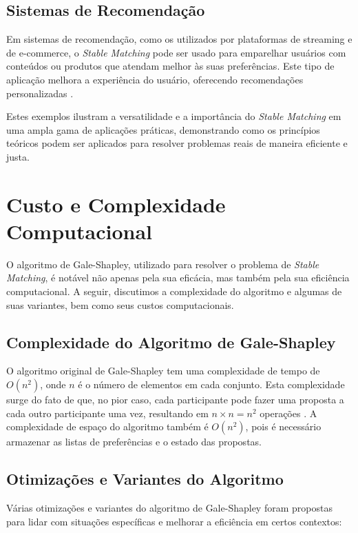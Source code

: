 \documentclass[12pt]{article}
\begin{document}
\subsection{Sistemas de Recomendação}

Em sistemas de recomendação, como os utilizados por plataformas de streaming e de e-commerce, o \textit{Stable Matching} pode ser usado para emparelhar usuários com conteúdos ou produtos que atendam melhor às suas preferências. Este tipo de aplicação melhora a experiência do usuário, oferecendo recomendações personalizadas \cite{deshpande2004item}.

Estes exemplos ilustram a versatilidade e a importância do \textit{Stable Matching} em uma ampla gama de aplicações práticas, demonstrando como os princípios teóricos podem ser aplicados para resolver problemas reais de maneira eficiente e justa.

\section{Custo e Complexidade Computacional}

O algoritmo de Gale-Shapley, utilizado para resolver o problema de \textit{Stable Matching}, é notável não apenas pela sua eficácia, mas também pela sua eficiência computacional. A seguir, discutimos a complexidade do algoritmo e algumas de suas variantes, bem como seus custos computacionais.

\subsection{Complexidade do Algoritmo de Gale-Shapley}

O algoritmo original de Gale-Shapley tem uma complexidade de tempo de \(O(n^2)\), onde \(n\) é o número de elementos em cada conjunto. Esta complexidade surge do fato de que, no pior caso, cada participante pode fazer uma proposta a cada outro participante uma vez, resultando em \(n \times n = n^2\) operações \cite{gale:62}. A complexidade de espaço do algoritmo também é \(O(n^2)\), pois é necessário armazenar as listas de preferências e o estado das propostas.

\subsection{Otimizações e Variantes do Algoritmo}

Várias otimizações e variantes do algoritmo de Gale-Shapley foram propostas para lidar com situações específicas e melhorar a eficiência em certos contextos:
\end{document}

